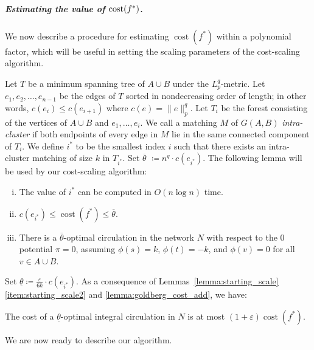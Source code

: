 \documentclass[a4paper,UKenglish]{socg-lipics-v2018}
\def\eps{\varepsilon}
\def\norm#1{\mathopen\| #1 \mathclose\|}	%
\def\fsupply{\phi}
\def\cost{\operatorname{cost}}
\theoremstyle{plain}
\numberwithin{figure}{section}
\renewcommand{\paragraph}{\subparagraph}
\def\EMPH#1{\textcolor{BrickRed}{{\emph{#1}}}}
\begin{document}
\paragraph{Estimating the value of \textbf{$\boldmath \cost(f^*)$}.}
We now describe a procedure for estimating $\cost(f^*)$ within a polynomial factor,
which will be useful in setting the scaling parameters of the cost-scaling algorithm.

Let \EMPH{$T$} be a minimum spanning tree of $A \cup B$ under the $L_p^q$-metric.
Let $e_1, e_2, \ldots, e_{n-1}$ be the edges of $T$ sorted in nondecreasing order
of length; in other words, $c(e_i) \leq c(e_{i+1})$ where $c(e) = \norm{e}_p^q$.
Let \EMPH{$T_i$} be the forest consisting of the vertices of $A \cup B$ and
$e_1, \ldots, e_i$.
We call a matching $M$ of $G(A, B)$ \EMPH{intra-cluster} if both endpoints of
every edge in $M$ lie in the same connected component of $T_i$.
We define \EMPH{$i^*$} to be the smallest index $i$ such that there exists an
intra-cluster matching of size $k$ in $T_{i^*}$.
Set \EMPH{$\overline{\theta}$} $\coloneqq n^q \cdot c(e_{i^*})$.
The following lemma will be used by our cost-scaling algorithm:

\begin{lemma}
\label{lemma:starting_scale}
\begin{enumerate}[(i)]
\item \label{item:starting_scale1}
	The value of $i^*$ can be computed in $O(n\log n)$ time.
\item \label{item:starting_scale2}
	$c(e_{i^*}) \leq \cost(f^*) \leq \overline{\theta}$.
\item \label{item:starting_scale3}
	There is a $\overline{\theta}$-optimal circulation in the network $N$ with
	respect to the 0 potential $\pi = 0$, assuming $\fsupply(s) = k$,
	$\fsupply(t) = -k$, and $\fsupply(v) = 0$ for all $v \in A \cup B$.
\end{enumerate}
\end{lemma}

Set $\underline{\theta} \coloneqq \frac{\eps}{6k} \cdot c(e_{i^*})$.
As a consequence of Lemmas~\ref{lemma:starting_scale}\ref{item:starting_scale2}
and \ref{lemma:goldberg_cost_add}, we have:

\begin{corollary}
\label{corollary:goldberg_approx}
The cost of a $\underline{\theta}$-optimal integral circulation in $N$ is at
most $(1+\eps) \cost(f^*)$.
\end{corollary}

We are now ready to describe our algorithm.
\end{document}
